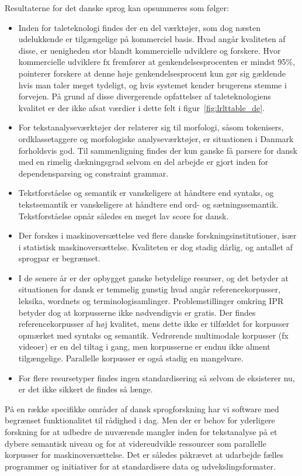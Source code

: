 \documentclass[]{../../metanetpaper}
\begin{document}
\begin{multicols}{2}
Resultaterne for det danske sprog kan opsummeres som f\o lger:
 \begin{itemize}
      \item Inden for taleteknologi findes der en del v\ae rkt\o jer, som dog n\ae sten udelukkende er tilg\ae ngelige \mbox{p\aa} kommerciel basis. Hvad ang\aa r kvaliteten af disse, er uenigheden stor blandt kommercielle udviklere og forskere. Hvor kommercielle udviklere fx fremf\o rer at genkendelsesprocenten er mindst 95\%, pointerer forskere at denne h\o je genkendelsesprocent kun g\o r sig g\ae ldende hvis man taler meget tydeligt, og hvis systemet kender brugerens stemme i forvejen. \mbox{P\aa} grund af disse divergerende opfattelser af taleteknologiens kvalitet er der ikke afsat v\ae rdier i dette felt i figur~\ref{fig:lrlttable_de}.
\item For tekstanalysev\ae rkt\o jer der relaterer sig til morfologi, \mbox{s\aa}som tokenisers, ordklassetaggere og morfologiske analysev\ae rkt\o jer, er situationen i Danmark forholdsvis god. Til sammenligning findes der kun ganske \mbox{f\aa} parsere for dansk med en rimelig d\ae kningsgrad selvom en del arbejde er gjort inden for dependensparsing og constraint grammar.
\item \sloppy Tekstforst\aa else og semantik er vanskeligere at h\aa ndtere end syntaks, og tekstsemantik er vanskeligere at h\aa ndtere end ord- og s\ae tningssemantik. Tekstforst\aa else opn\aa r s\aa ledes en meget lav score for dansk. 
\item Der forskes i maskinovers\ae ttelse ved flere danske forskningsinstitutioner, is\ae r i statistisk maskinovers\ae ttelse. Kvaliteten er dog stadig d\aa rlig, og antallet af sprogpar er begr\ae nset. 
\item I de senere \aa r er der opbygget ganske betydelige resurser, og det betyder at situationen for dansk er temmelig gunstig hvad ang\aa r referencekorpusser, leksika, wordnets og terminologisamlinger. Problemstillinger omkring IPR betyder dog at korpusserne ikke n\o dvendigvis er gratis. Der findes referencekorpusser af h\o j kvalitet, mens dette ikke er tilf\ae ldet for korpusser opm\ae rket med syntaks og semantik. Vedr\o rende multimodale korpusser (fx videoer) er en del tiltag i gang, men korpusserne er endnu ikke alment tilg\ae ngelige. Parallelle korpusser er \mbox{ogs\aa} stadig en mangelvare. 
\item For flere resursetyper findes ingen standardisering \mbox{s\aa} selvom de eksisterer nu, er det ikke sikkert de findes \mbox{s\aa} l\ae nge.
\end{itemize}
\mbox{P\aa}  en r\ae kke specifikke omr\aa der af dansk sprogforskning har vi software med begr\ae nset funktionalitet til r\aa dighed i dag. Men der er behov for yderligere forskning for at udbedre de nuv\ae rende  mangler inden for tekstanalyse \mbox{p\aa} et dybere semantisk niveau og for at videreudvikle ressourcer som parallelle korpusser for maskinoversættelse.
Det er s\aa ledes p\aa kr\ae vet at udarbejde f\ae lles programmer og initiativer for at standardisere data og udvekslingsformater. 


\end{multicols}
\end{document}
